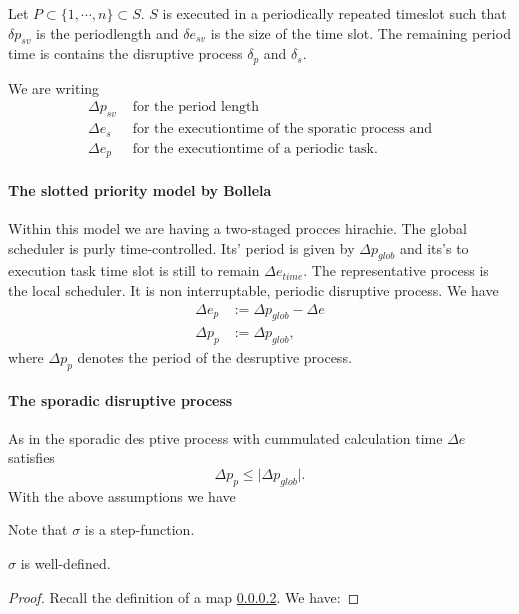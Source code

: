 Let $P \subset \{1, \cdots, n\} \subset S$.
$S$ is executed in a periodically repeated timeslot such that $\delta p_{sv}$ is the periodlength and $\delta e_{sv}$ is the size of the time slot.
The remaining period time is contains the  disruptive process $\delta_p$ and $\delta_s$.

We are writing
\begin{align}
	\Delta p_{sv} &\text{ for the period length} \\
	\Delta e_s &\text{ for the executiontime of the sporatic process and}\\ 
	\Delta e_p &\text{ for the executiontime of a periodic task.}
\end{align}

\paragraph{The slotted priority model by Bollela}

Within this model we are having a two-staged procces hirachie. 
The global scheduler is purly time-controlled.
Its' period is given by $\Delta p_{glob}$ and its's to execution task time slot is still to remain $\Delta e_{time}$.
The representative process is the local scheduler. 
It is non interruptable, periodic disruptive process.
We have
\begin{align}
\Delta e_p &:= \Delta p_{glob} - \Delta e\\
\Delta p_{p} &:= \Delta p_{glob}, 
\end{align}
where $\Delta p_{p}$ denotes the period of the desruptive process.

\paragraph{The sporadic disruptive process}
As in \cite{K} the sporadic des
ptive process with cummulated calculation time $\Delta e$ satisfies
\begin{equation}
\Delta p_{p} \leq \lvert{\Delta p_{glob}} \rvert. 
\end{equation}
With the above assumptions we have

\begin{theorem}
\end{theorem}

\begin{remark}
Note that $\sigma$ is a step-function. 
\end{remark}

\begin{lemma}
 $\sigma$ is well-defined.
\end{lemma}
\begin{proof}
Recall the definition of a map \ref{}. We have:
\end{proof}

